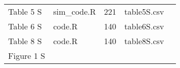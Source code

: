 \documentclass[
]{article}
\begin{document}
\begin{longtable}[]{@{}lllll@{}}
\begin{minipage}[t]{0.13\columnwidth}
Table 5 S\strut
\end{minipage} & \begin{minipage}[t]{0.18\columnwidth}\raggedright
sim\_code.R\strut
\end{minipage} & \begin{minipage}[t]{0.09\columnwidth}\raggedright
221\strut
\end{minipage} & \begin{minipage}[t]{0.23\columnwidth}\raggedright
table5S.csv\strut
\end{minipage} & \begin{minipage}[t]{0.23\columnwidth}\raggedright
\strut
\end{minipage}\tabularnewline
\begin{minipage}[t]{0.13\columnwidth}\raggedright
Table 6 S\strut
\end{minipage} & \begin{minipage}[t]{0.18\columnwidth}\raggedright
code.R\strut
\end{minipage} & \begin{minipage}[t]{0.09\columnwidth}\raggedright
140\strut
\end{minipage} & \begin{minipage}[t]{0.23\columnwidth}\raggedright
table6S.csv\strut
\end{minipage} & \begin{minipage}[t]{0.23\columnwidth}\raggedright
\strut
\end{minipage}\tabularnewline
\begin{minipage}[t]{0.13\columnwidth}\raggedright
Table 8 S\strut
\end{minipage} & \begin{minipage}[t]{0.18\columnwidth}\raggedright
code.R\strut
\end{minipage} & \begin{minipage}[t]{0.09\columnwidth}\raggedright
140\strut
\end{minipage} & \begin{minipage}[t]{0.23\columnwidth}\raggedright
table8S.csv\strut
\end{minipage} & \begin{minipage}[t]{0.23\columnwidth}\raggedright
\strut
\end{minipage}\tabularnewline
\begin{minipage}[t]{0.13\columnwidth}\raggedright
Figure 1 S\strut
\end{minipage} & \begin{minipage}[t]{0.18\columnwidth}\raggedright

\end{minipage}
\end{longtable}
\end{document}

